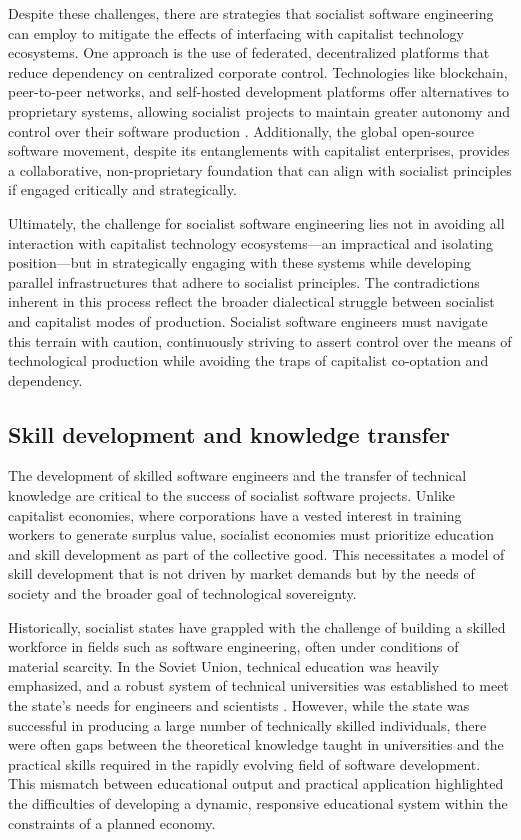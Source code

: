\begin{refsection}
Despite these challenges, there are strategies that socialist software engineering can employ to mitigate the effects of interfacing with capitalist technology ecosystems. One approach is the use of federated, decentralized platforms that reduce dependency on centralized corporate control. Technologies like blockchain, peer-to-peer networks, and self-hosted development platforms offer alternatives to proprietary systems, allowing socialist projects to maintain greater autonomy and control over their software production \cite[pp.~23-26]{moglen}. Additionally, the global open-source software movement, despite its entanglements with capitalist enterprises, provides a collaborative, non-proprietary foundation that can align with socialist principles if engaged critically and strategically.

Ultimately, the challenge for socialist software engineering lies not in avoiding all interaction with capitalist technology ecosystems—an impractical and isolating position—but in strategically engaging with these systems while developing parallel infrastructures that adhere to socialist principles. The contradictions inherent in this process reflect the broader dialectical struggle between socialist and capitalist modes of production. Socialist software engineers must navigate this terrain with caution, continuously striving to assert control over the means of technological production while avoiding the traps of capitalist co-optation and dependency.

\subsection{Skill development and knowledge transfer}

The development of skilled software engineers and the transfer of technical knowledge are critical to the success of socialist software projects. Unlike capitalist economies, where corporations have a vested interest in training workers to generate surplus value, socialist economies must prioritize education and skill development as part of the collective good. This necessitates a model of skill development that is not driven by market demands but by the needs of society and the broader goal of technological sovereignty.

Historically, socialist states have grappled with the challenge of building a skilled workforce in fields such as software engineering, often under conditions of material scarcity. In the Soviet Union, technical education was heavily emphasized, and a robust system of technical universities was established to meet the state's needs for engineers and scientists \cite[pp.~112-115]{kornai}. However, while the state was successful in producing a large number of technically skilled individuals, there were often gaps between the theoretical knowledge taught in universities and the practical skills required in the rapidly evolving field of software development. This mismatch between educational output and practical application highlighted the difficulties of developing a dynamic, responsive educational system within the constraints of a planned economy.


\end{refsection}
